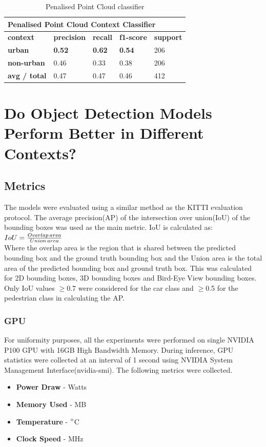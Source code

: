 \begin{table}[h] %
	\centering
	\begin{tabular}{|l|l|l|l|l|}
		\hline
		\multicolumn{5}{|l|}{\textbf{Penalised Point Cloud Context Classifier}}                            \\ \hline
		\textbf{context}            & \textbf{precision} & \textbf{recall} & \textbf{f1-score} & \textbf{support} \\ \hline
		\textbf{urban}       & \textbf{0.52}      & \textbf{0.62}   & \textbf{0.54}     & 206              \\ \hline
		\textbf{non-urban}   & 0.46               & 0.33            & 0.38              & 206              \\ \hline
		\textbf{avg / total} & 0.47               & 0.47            & 0.46              & 412              \\ \hline
	\end{tabular}
	\caption{Penalised Point Cloud classifier}
	\label{tab:penalisedpcl}
\end{table}

\section{Do Object Detection Models Perform Better in Different Contexts?}
\subsection*{Metrics}
The models were evaluated using a similar method as the KITTI evaluation protocol. The average precision(AP) of the intersection over union(IoU) of the bounding boxes was used as the main metric.
IoU is calculated as: \\ 
\begin{math}
\centering
IoU = \frac{Overlap\, area}{Union\, area}
\end{math} \\ 
Where the overlap area is the region that is shared between the predicted bounding box and the ground truth bounding box and the Union area is the total area of the predicted bounding box and ground truth box.
This was calculated for 2D bounding boxes, 3D bounding boxes and Bird-Eye View bounding boxes. Only IoU values $\geq$0.7 were considered for the car class and $\geq$0.5 for the pedestrian class in calculating the AP. 

\subsubsection*{GPU}
For uniformity purposes, all the experiments were performed on single NVIDIA P100 GPU with 16GB High Bandwidth Memory. 
During inference, GPU statistics were collected at an interval of 1 second using NVIDIA System Management Interface(nvidia-smi). The following metrics were collected. 
\begin{itemize}[noitemsep]
	\item \textbf{Power Draw } - Watts
	\item \textbf{Memory Used } - MB
	\item \textbf{Temperature} - $\degree$C
	\item \textbf{Clock Speed} - MHz
\end{itemize}
